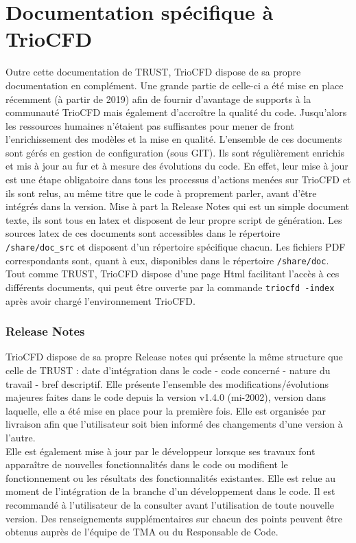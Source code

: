 \chapter{\label{chapitre:doc-trio}Documentation spécifique à TrioCFD}
Outre cette documentation de TRUST, TrioCFD dispose de sa propre documentation en complément. Une grande partie de celle-ci a été mise en place récemment (à partir de 2019) afin de fournir d'avantage de supports à la communauté TrioCFD mais également d'accroître la qualité du code. Jusqu'alors les ressources humaines n'étaient pas suffisantes pour mener de front l'enrichissement des modèles et la mise en qualité. L'ensemble de ces documents sont gérés en gestion de configuration (sous GIT). Ils sont régulièrement enrichis et mis à jour au fur et à mesure des évolutions du code. En effet, leur mise à jour est une étape obligatoire dans tous les processus d'actions menées sur TrioCFD et ils sont relus, au même titre que le code à proprement parler, avant d'être intégrés dans la version. Mise à part la Release Notes qui est un simple document texte, ils sont tous en latex et disposent de leur propre script de génération. Les sources latex de ces documents sont accessibles dans le répertoire \texttt{/share/doc\_src} et disposent d'un répertoire spécifique chacun. Les fichiers PDF correspondants sont, quant à eux, disponibles dans le répertoire \texttt{/share/doc}. Tout comme TRUST, TrioCFD dispose d'une page Html facilitant l'accès à ces différents documents, qui peut être ouverte par la commande \texttt{triocfd -index} après avoir chargé l'environnement TrioCFD.
\subsection{Release Notes}
TrioCFD dispose de sa propre Release notes qui présente la même structure que celle de TRUST : date d'intégration dans le code - code concerné - nature du travail - bref descriptif. Elle présente l'ensemble des modifications/évolutions majeures faites dans le code depuis la version v1.4.0 (mi-2002), version dans laquelle, elle a été mise en place pour la première fois. Elle est organisée par livraison afin que l'utilisateur soit bien informé des changements d'une version à l'autre.\\
Elle est également mise à jour par le développeur lorsque ses travaux font apparaître de nouvelles fonctionnalités dans le code ou modifient le fonctionnement ou les résultats des fonctionnalités existantes. Elle est relue au moment de l'intégration de la branche d'un développement dans le code. Il est recommandé à l'utilisateur de la consulter avant l'utilisation de toute nouvelle version. Des renseignements supplémentaires sur chacun des points peuvent être obtenus auprès de l'équipe de TMA ou du Responsable de Code.
